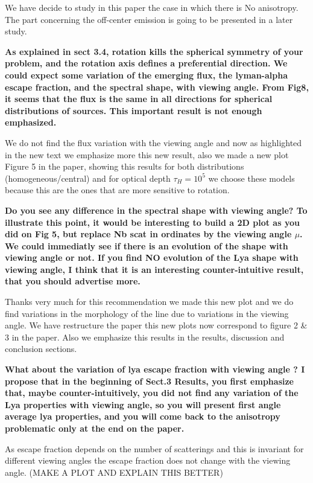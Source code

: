 \documentclass[12pt]{article}
\begin{document}
We have decide to study in this paper the case in which there is No anisotropy. The part concerning the off-center emission is going to be presented in a later study.

{\bf As explained in sect 3.4, rotation kills the spherical symmetry of your problem, and the rotation axis defines a preferential direction. We could expect some variation of the emerging flux, the lyman-alpha escape fraction, and the spectral shape, with viewing angle. From Fig8, it seems that the flux is the same in all directions for spherical distributions of sources. This important result is not enough emphasized.}

We do not find the flux variation with the viewing angle and now as
highlighted in the new text we emphasize more this new result, also we
made a new plot Figure 5 in the paper, showing this results for both
distributions (homogeneous/central) and for optical depth
$\tau_{H}=10^{5}$ we choose these models because this are the ones  that are more sensitive to rotation.

{\bf Do you see any difference in the spectral shape with viewing angle? To illustrate this point, it would be interesting to build a 2D plot as you did on Fig 5, but replace Nb scat in ordinates by the viewing angle $\mu$. We could immediatly see if there is an evolution of the shape with viewing angle or not. If you find NO evolution of the Lya shape with viewing angle, I think that it is an interesting counter-intuitive result, that you should advertise more.}

Thanks very much for this recommendation we made this new plot and we do find variations in the morphology of the line due to variations in the viewing angle. We have restructure the paper this new plots now correspond to figure 2 \& 3 in the paper.  Also we emphasize this results in the results, discussion and conclusion sections.

{\bf What about the variation of lya escape fraction with viewing angle ? I propose that in the beginning of Sect.3 Results, you first emphasize that, maybe counter-intuitively, you did not find any variation of the Lya properties with viewing angle, so you will present first angle average lya properties, and you will come back to the anisotropy problematic only at the end on the paper.}

As escape fraction depends on the number of scatterings and this is invariant for different viewing angles the escape fraction does not change with the viewing angle. (MAKE A PLOT AND EXPLAIN THIS BETTER)
\end{document}
